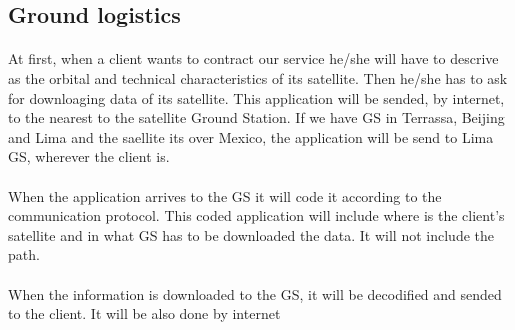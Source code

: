 \subsection{Ground logistics}
\paragraph{}
At first, when a client wants to contract our service he/she will have to descrive as the orbital and technical characteristics of its satellite. Then he/she has to ask for downloaging data of its satellite. This application will be sended, by internet, to the nearest to the satellite Ground Station. If we have GS in Terrassa, Beijing and Lima and the saellite its over Mexico, the application will be send to Lima GS, wherever the client is.
\paragraph{}
When the application arrives to the GS it will code it according to the communication protocol. This coded application will include where is the client's satellite and in what GS has to be downloaded the data. It will not include the path.
\paragraph{}
When the information is downloaded to the GS, it will be decodified and sended to the client. It will be also done by internet